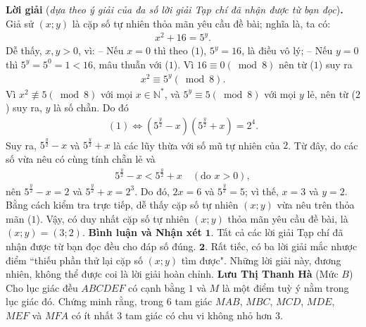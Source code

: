 \begin{multicols}{2}
	\vskip 0.05cm
	\textbf{\color{thachthuctoanhoc}Lời giải} (\textit{dựa theo ý giải của đa số lời giải Tạp chí đã nhận được từ bạn đọc})\textbf{\color{thachthuctoanhoc}.}
	\vskip 0.05cm
	Giả sử $(x; y)$ là cặp số tự nhiên thỏa mãn yêu cầu đề bài; nghĩa là, ta có:
	\begin{align*}
		{x^2} + 16 = {5^y}. \tag{$1$}
	\end{align*}
	Dễ thấy, $x, y > 0$, vì:
	\vskip 0.05cm
	-- Nếu $x = 0$ thì theo ($1$), $5^y= 16$, là điều vô lý;
	\vskip 0.05cm
	-- Nếu $y = 0$ thì $5^y = 5^0 = 1 < 16$, mâu thuẫn với ($1$).
	\vskip 0.05cm
	Vì  $16 \equiv 0\left( {\bmod 8} \right)$ nên từ ($1$) suy ra 
	\begin{align*}
		{x^2} \equiv {5^y}\left( {\bmod 8} \right). \tag{$2$}
	\end{align*}
	Vì ${x^2}\not  \equiv 5\left( {\bmod 8} \right)$  với mọi $x \in \mathbb{N^*}$,   và  ${5^y} \equiv 5\left( {\bmod 8} \right)$ với mọi $y$ lẻ, nên từ ($2$) suy ra, $y$ là số chẵn. Do đó
	\begin{align*}
		(1) \Leftrightarrow \left( {{5^{\frac{y}{2}}} - x} \right)\!\!\left( {{5^{\frac{y}{2}}} + x} \right) = {2^4}.
	\end{align*}
	Suy ra, ${5^{\frac{y}{2}}} - x$  và ${5^{\frac{y}{2}}} + x$  là các lũy thừa với số mũ tự nhiên của $2$. Từ đây, do các số vừa nêu có cùng tính chẵn lẻ và
	\begin{align*}
		{5^{\frac{y}{2}}} - x < {5^{\frac{y}{2}}} + x \quad(\text{do } x > 0),
	\end{align*}
	nên ${5^{\frac{y}{2}}} - x = 2$  và ${5^{\frac{y}{2}}} + x = {2^3}.$  Do đó, \linebreak $2x = 6$ và ${5^{\frac{y}{2}}} = 5$; vì thế, $x = 3$ và $y = 2$.
	\vskip 0.05cm
	Bằng cách kiểm tra trực tiếp, dễ thấy cặp số tự nhiên $(x; y)$ vừa nêu trên thỏa mãn ($1$).
	\vskip 0.05cm
	Vậy, có duy nhất cặp số tự nhiên $(x; y)$ thỏa mãn yêu cầu đề bài, là $(x; y) = (3; 2)$.
	\vskip 0.05cm
	\textbf{\color{thachthuctoanhoc}Bình luận và Nhận xét}
	\vskip 0.05cm
	$\pmb{1.}$ Tất cả các lời giải Tạp chí đã nhận được từ bạn đọc đều cho đáp số đúng.
	\vskip 0.05cm
	$\pmb{2.}$ Rất tiếc, có ba lời giải mắc nhược điểm ``thiếu phần thử lại cặp số $(x; y)$ tìm được". Những lời giải này, đương nhiên, không thể được coi là lời giải hoàn chỉnh.
	\vskip 0.1cm
	\hfill	\textbf{\color{thachthuctoanhoc}Lưu Thị Thanh Hà}
	\vskip 0.1cm
	{}
	(Mức $B$) Cho lục giác đều $ABCDEF$ có cạnh bằng $1$ và $M$ là một điểm tuỳ ý nằm trong lục giác đó. Chứng minh rằng, trong $6$ tam giác $MAB$, $MBC$, $MCD$, $MDE$, $MEF$ và $MFA$ có ít nhất $3$ tam giác có chu vi không nhỏ hơn $3$. 

\end{multicols}
